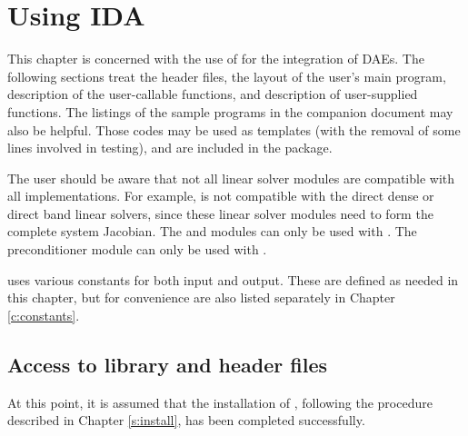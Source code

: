 \chapter{Using IDA}\label{s:simulation}

This chapter is concerned with the use of {\ida} for the integration of DAEs.
The following sections treat the header files, the layout of the user's main
program, description of the {\ida} user-callable functions, and 
description of user-supplied functions. 
The listings of the sample programs in the companion document \cite{ida2.2.0_ex} 
may also be helpful. Those codes may be used as templates (with the removal of
some lines involved in testing), and are included in the {\ida} package.

The user should be aware that not all linear solver modules are compatible 
with all {\nvector} implementations. 
For example, {\nvecp} is not compatible with the direct dense or direct band 
linear solvers, since these linear solver modules need to form the complete
system Jacobian.
The {\idadense} and {\idaband} modules can only be used with {\nvecs}. 
The preconditioner module {\idabbdpre} can only be used with {\nvecp}. 

{\ida} uses various constants for both input and output.  These are
defined as needed in this chapter, but for convenience are also listed
separately in Chapter \ref{c:constants}.

\section{Access to library and header files}\label{ss:file_access}

At this point, it is assumed that the installation of {\ida},
following the procedure described in Chapter \ref{s:install}, has
been completed successfully.

